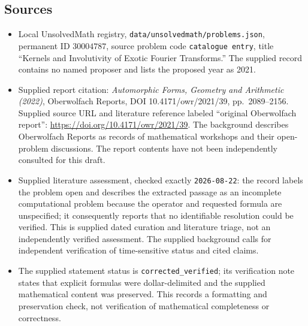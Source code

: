 \documentclass[11pt]{article}
\begin{document}
\subsection{Sources}
\begin{itemize}
\item Local UnsolvedMath registry, \texttt{data/unsolvedmath/problems.json}, permanent ID \(30004787\), source problem code \texttt{catalogue entry}, title ``Kernels and Involutivity of Exotic Fourier Transforms.'' The supplied record contains no named proposer and lists the proposed year as 2021.
\item Supplied report citation: \emph{Automorphic Forms, Geometry and Arithmetic (2022)}, Oberwolfach Reports, DOI 10.4171/owr/2021/39, pp.\ 2089--2156. Supplied source URL and literature reference labeled ``original Oberwolfach report'': \url{https://doi.org/10.4171/owr/2021/39}. The background describes Oberwolfach Reports as records of mathematical workshops and their open-problem discussions. The report contents have not been independently consulted for this draft.
\item Supplied literature assessment, checked exactly \texttt{2026-08-22}: the record labels the problem open and describes the extracted passage as an incomplete computational problem because the operator and requested formula are unspecified; it consequently reports that no identifiable resolution could be verified. This is supplied dated curation and literature triage, not an independently verified assessment. The supplied background calls for independent verification of time-sensitive status and cited claims.
\item The supplied statement status is \texttt{corrected\_verified}; its verification note states that explicit formulas were dollar-delimited and the supplied mathematical content was preserved. This records a formatting and preservation check, not verification of mathematical completeness or correctness.
\end{itemize}
\end{document}
